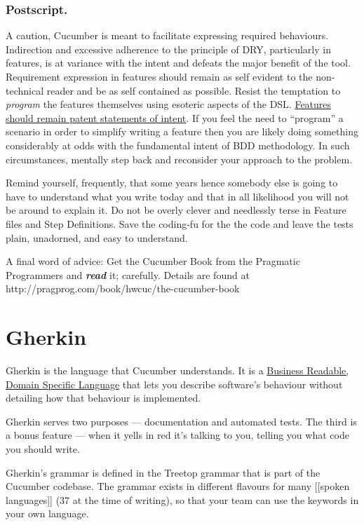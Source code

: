 \documentclass[10pt]{book}
\begin{document}
\subsection{Postscript.}

A caution, Cucumber is meant to facilitate expressing required behaviours.  Indirection and excessive adherence to the principle of DRY, particularly in features, is at variance with the intent and defeats the major benefit of the tool.  Requirement expression in features should remain as self evident to the non-technical reader and be as self contained as possible.  Resist the temptation to \emph{program} the features themselves using esoteric aspects of the DSL.  \href{http://mislav.uniqpath.com/2010/09/cuking-it-right/}{Features should remain patent statements of intent}.  If you feel the need to ``program'' a scenario in order to simplify writing a feature then you are likely doing something considerably at odds with the fundamental intent of BDD methodology.  In such circumstances, mentally step back and reconsider your approach to the problem.

Remind yourself, frequently, that some years hence somebody else is going to have to understand what you write today and that in all likelihood you will not be around to explain it.  Do not be overly clever and needlessly terse in Feature files and Step Definitions.  Save the coding-fu for the the code and leave the tests plain, unadorned, and easy to understand.

A final word of advice: Get the Cucumber Book from the Pragmatic Programmers and \textbf{\emph{read}} it; carefully.  Details are found at http://pragprog.com/book/hwcuc/the-cucumber-book

\chapter{Gherkin}

Gherkin is the language that Cucumber understands. It is a \href{http://martinfowler.com/bliki/BusinessReadableDSL.html}{Business Readable, Domain Specific Language} that lets you describe software's behaviour without detailing how that behaviour is implemented.

Gherkin serves two purposes — documentation and automated tests. The third is a bonus feature — when it yells in red it's talking to you, telling you what code you should write.

Gherkin's grammar is defined in the Treetop grammar that is part of the Cucumber codebase. The grammar exists in different flavours for many [[spoken languages]] (37 at the time of writing), so that your team can use the keywords in your own language.
\end{document}
